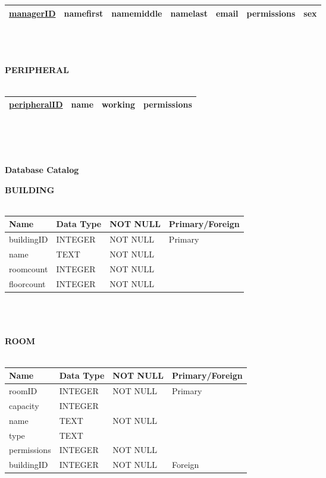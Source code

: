 \documentclass{article}
\begin{document}
\begin{tabular}{|c|l|l|l|l|l|l|}
    \hline
    \underline{managerID} & namefirst & namemiddle & namelast & email & permissions & sex \\ \hline
\end{tabular}\\\\\\
\textbf{\Large PERIPHERAL}\\\\
\begin{tabular}{|c|l|l|l|}
    \hline
    \underline{peripheralID} & name & working & permissions \\ \hline
\end{tabular}\\\\\\
\newpage
\begin{center}\textbf{\large Database Catalog}\end{center}
\textbf{\Large BUILDING}\\\\
\begin{tabularx}{\textwidth}{|X|X|X|X|}
    \hline
    \textbf{\large Name} & \textbf{\large Data Type} & \textbf{\large NOT NULL} & \textbf{\large Primary/Foreign} \\ \hline buildingID & INTEGER & NOT NULL & Primary \\ \hline name & TEXT & NOT NULL & \\ \hline roomcount & INTEGER & NOT NULL & \\ \hline floorcount & INTEGER & NOT NULL & \\ \hline
\end{tabularx}\\\\\\
\textbf{\Large ROOM}\\\\
\begin{tabularx}{\textwidth}{|X|X|X|X|}
    \hline
    \textbf{\large Name} & \textbf{\large Data Type} & \textbf{\large NOT NULL} & \textbf{\large Primary/Foreign} \\ \hline roomID & INTEGER & NOT NULL & Primary \\ \hline capacity & INTEGER & & \\ \hline name & TEXT & NOT NULL & \\ \hline type & TEXT & & \\ \hline permissions & INTEGER & NOT NULL & \\ \hline buildingID & INTEGER & NOT NULL & Foreign \\ \hline
\end{tabularx}\\\\\\
\end{document}
